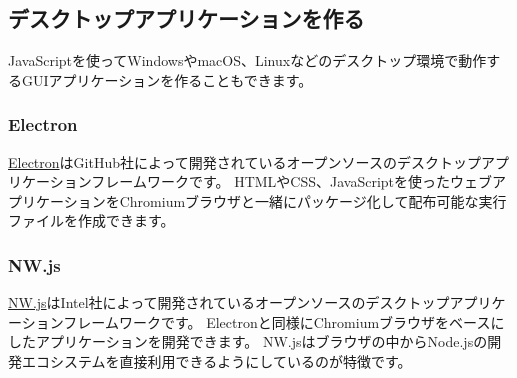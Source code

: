 \hypertarget{desktop-app}{%
\subsection{デスクトップアプリケーションを作る}\label{desktop-app}}

JavaScriptを使ってWindowsやmacOS、Linuxなどのデスクトップ環境で動作するGUIアプリケーションを作ることもできます。

\hypertarget{electron}{%
\subsubsection{Electron}\label{electron}}

\href{https://electronjs.org/}{Electron}はGitHub社によって開発されているオープンソースのデスクトップアプリケーションフレームワークです。
HTMLやCSS、JavaScriptを使ったウェブアプリケーションをChromiumブラウザと一緒にパッケージ化して配布可能な実行ファイルを作成できます。

\hypertarget{nwjs}{%
\subsubsection{NW.js}\label{nwjs}}

\href{https://nwjs.io/}{NW.js}はIntel社によって開発されているオープンソースのデスクトップアプリケーションフレームワークです。
Electronと同様にChromiumブラウザをベースにしたアプリケーションを開発できます。
NW.jsはブラウザの中からNode.jsの開発エコシステムを直接利用できるようにしているのが特徴です。
